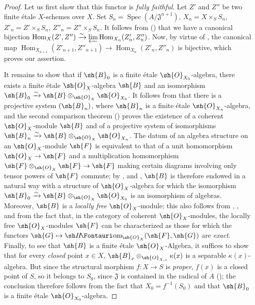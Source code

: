 \begin{proof}
Let us first show that this functor is \emph{fully faithful}.
Let $Z'$ and $Z''$ be two finite \'etale $X$-schemes over $X$.
Set $S_n=\operatorname{Spec}(A/\mathfrak{J}^{n+1})$, $X_n=X\times_S S_n$, $Z'_n=Z'\times_S S_n$, $Z''_n=Z''\times_S S_n$.
It follows from () that we have a canonical bijection $\operatorname{Hom}_X(Z',Z'')\xrightarrow{\sim}\varprojlim\operatorname{Hom}_{X_n}(Z'_n,Z''_n)$.
Now, by virtue of , the canonical map $\operatorname{Hom}_{X_{n+1}}(Z'_{n+1},Z''_{n+1})\to\operatorname{Hom}_{X_n}(Z'_n,Z''_n)$ is bijective, which proves our assertion.

It remains to show that if $\sh{B}_0$ is a finite \'etale $\sh{O}_{X_0}$-algebra, there exists a finite \'etale $\sh{O}_X$-algebra $\sh{B}$ and an isomorphism $\sh{B}_0\xrightarrow{\sim}\sh{B}\otimes_{\sh{O}_X}\sh{O}_{X_0}$.
It follows from  that there is a projective system $(\sh{B}_n)$, where $\sh{B}_n$ is a finite \'etale $\sh{O}_{X_n}$-algebra, and the second comparison theorem () proves the existence of a coherent $\sh{O}_X$-module $\sh{B}$ and of a projective system of isomorphisms $\sh{B}_n\xrightarrow{\sim}\sh{B}\otimes_{\sh{O}_X}\sh{O}_{X_n}$.
The datum of an algebra structure on an $\sh{O}_X$-module $\sh{F}$ is equivalent to that of a unit homomorphism $\sh{O}_X\to\sh{F}$ and a multiplication homomorphism $\sh{F}\otimes_{\sh{O}_X}\sh{F}\to\sh{F}$ making certain diagrams involving only tensor powers of $\sh{F}$ commute;
by ,  and , $\sh{B}$ is therefore endowed in a natural way with a structure of $\sh{O}_X$-algebra for which the isomorphism $\sh{B}_0\xrightarrow{\sim}\sh{B}\otimes_{\sh{O}_X}\sh{O}_{X_0}$ is an isomorphism of algebras.
Moreover, $\sh{B}$ is a \emph{locally free} $\sh{O}_X$-module;
this also follows from , ,  and from the fact that, in the category of coherent $\sh{O}_X$-modules, the locally free $\sh{O}_X$-modules $\sh{F}$ can be characterized as those for which the functors $\sh{G}\mapsto\shHom_{\sh{O}_X}(\sh{F},\sh{G})$ are \emph{exact}.
Finally, to see that $\sh{B}$ is a finite \'etale $\sh{O}_X$-Algebra, it suffices  to show that for every \emph{closed} point $x\in X$, $\sh{B}_x\otimes_{\sh{O}_{X,x}}\kappa(x)$ is a separable $\kappa(x)$-algebra.
But since the structural morphism $f:X\to S$ is \emph{proper}, $f(x)$ is a closed point of $S$, so it belongs to $S_0$, since $\mathfrak{J}$ is contained in the radical of $A$ ();
the conclusion therefore follows from the fact that $X_0=f^{-1}(S_0)$ and that $\sh{B}_0$ is a finite \'etale $\sh{O}_{X_0}$-algebra.
\end{proof}


